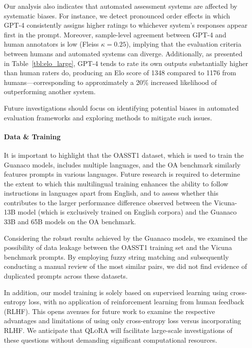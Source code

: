 Our analysis also indicates that automated assessment systems are affected by systematic biases. For instance, we detect pronounced order effects in which GPT-4 consistently assigns higher ratings to whichever system’s responses appear first in the prompt. Moreover, sample-level agreement between GPT-4 and human annotators is low (Fleiss $\kappa=0.25$), implying that the evaluation criteria between humans and automated systems can diverge. Additionally, as presented in Table~\ref{tbl:elo_large}, GPT-4 tends to rate its own outputs substantially higher than human raters do, producing an Elo score of 1348 compared to 1176 from humans—corresponding to approximately a 20\% increased likelihood of outperforming another system.

Future investigations should focus on identifying potential biases in automated evaluation frameworks and exploring methods to mitigate such issues.

\paragraph{Data \& Training} It is important to highlight that the OASST1 dataset, which is used to train the {Guanaco} models, includes multiple languages, and the OA benchmark similarly features prompts in various languages. Future research is required to determine the extent to which this multilingual training enhances the ability to follow instructions in languages apart from English, and to assess whether this contributes to the larger performance difference observed between the Vicuna-13B model (which is exclusively trained on English corpora) and the {Guanaco} 33B and 65B models on the OA benchmark.

Considering the robust results achieved by the {Guanaco} models, we examined the possibility of data leakage between the OASST1 training set and the Vicuna benchmark prompts. By employing fuzzy string matching and subsequently conducting a manual review of the most similar pairs, we did not find evidence of duplicated prompts across these datasets.

In addition, our model training is solely based on supervised learning using cross-entropy loss, with no application of reinforcement learning from human feedback (RLHF). This opens avenues for future work to examine the respective advantages and limitations of using only cross-entropy loss versus incorporating RLHF. We anticipate that \textsc{QLoRA} will facilitate large-scale investigations of these questions without demanding significant computational resources.

